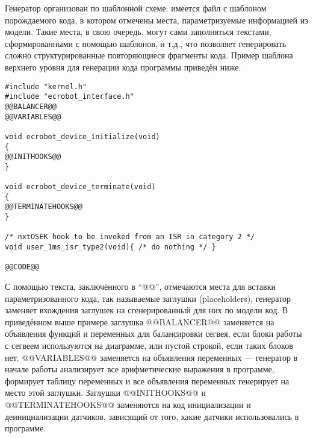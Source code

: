 Генератор организован по шаблонной схеме: имеется файл с шаблоном порождаемого кода, 
в котором отмечены места, параметризуемые информацией из модели. Такие места, в свою 
очередь, могут сами заполняться текстами, сформированными с помощью шаблонов, и т.д., 
что позволяет генерировать сложно структурированные  повторяющиеся фрагменты кода. 
Пример шаблона верхнего уровня для генерации кода программы приведён ниже.

\vspace{5mm}
\begin{minipage}{\linewidth}
\begin{verbatim}
#include "kernel.h"
#include "ecrobot_interface.h"
@@BALANCER@@
@@VARIABLES@@

void ecrobot_device_initialize(void)
{
@@INITHOOKS@@
}

void ecrobot_device_terminate(void)
{
@@TERMINATEHOOKS@@
}

/* nxtOSEK hook to be invoked from an ISR in category 2 */
void user_1ms_isr_type2(void){ /* do nothing */ }

@@CODE@@
\end{verbatim}
\end{minipage}
\vspace{5mm}

С помощью текста, заключённого в "`@@"', отмечаются места для вставки параметризованного 
кода, так называемые заглушки (placeholders), генератор заменяет вхождения заглушек 
на сгенерированный для них по модели код. В приведённом выше примере заглушка @@BALANCER@@ 
заменяется на объявления функций и переменных для балансировки сегвея, если блоки 
работы с сегвеем используются на диаграмме, или пустой строкой, если таких блоков нет. 
@@VARIABLES@@ заменяется на объявления переменных --- генератор в начале работы анализирует 
все арифметические выражения в программе, формирует таблицу переменных и все объявления 
переменных генерирует на место этой заглушки. Заглушки @@INITHOOKS@@ и @@TERMINATEHOOKS@@ 
заменяются на код инициализации и деинициализации датчиков, зависящий от того, какие 
датчики использовались в программе. 

